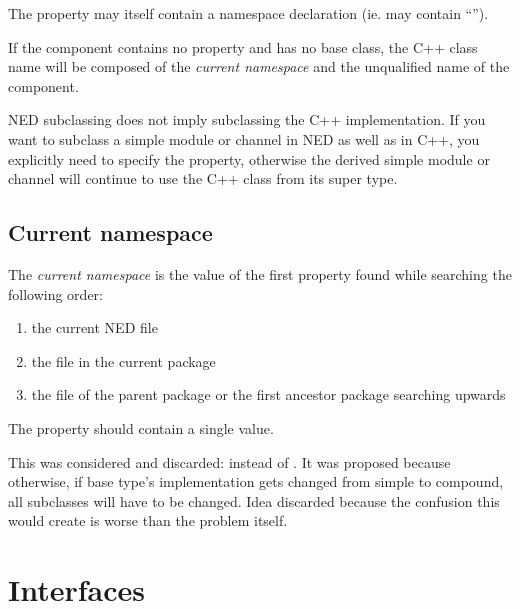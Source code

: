 \begin{note}
    The  property may itself contain a namespace declaration (ie.
    may contain ``\ttt{::}'').
\end{note}

If the component contains no  property and has no base
class, the C++ class name will be composed of the \textit{current namespace} and the
unqualified name of the component.

\begin{note}
    NED subclassing does not imply subclassing the C++ implementation. If you
    want to subclass a simple module or channel in NED as well as in C++, you
    explicitly need to specify the  property, otherwise the
    derived simple module or channel will continue to use the C++ class from its
    super type.
\end{note}

\subsection{Current namespace}
\label{cha:ned-ref:current-namespace}

The \textit{current namespace} is the value of the first 
property found while searching the following order:
\begin{enumerate}
  \item the current NED file
  \item the  file in the current package
  \item the  file of the parent package or the first ancestor
        package searching upwards
\end{enumerate}

The  property should contain a single value.

\begin{note}
    This was considered and discarded: 
    instead of . It was proposed because
    otherwise, if base type's implementation gets changed from simple to compound, all
    subclasses will have to be changed. Idea discarded because the confusion
    this would create is worse than the problem itself.
\end{note}


\section{Interfaces}

